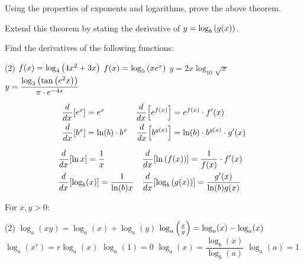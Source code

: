 \documentclass[mathNotesPreamble]{subfiles}
\begin{document}
  \begin{ex*}
    Using the properties of exponents and logarithms, prove the above theorem. 
    
    \noindent
    Extend this theorem by stating the derivative of $y=\log_b\parens{g(x)}$.
  \end{ex*}
  \vfill
  \begin{ex*}
    Find the derivatives of the following functions:
  \end{ex*}
  \begin{tasks}[after-item-skip=\stretch{1}, label=~](2)
    \task $f(x)=\log_4\parens{4x^2+3x}$
    \task $f(x)=\log_5\parens{x e^x}$
    \task $y=2x\log_{10}\sqrt x$
    \task $y=\dfrac{\log_3\parens{\tan\parens{e^2x}}}{\pi\cdot e\inv[4x]}$
  \end{tasks}
  \vfill
  \pagebreak
  
  \setlength{\jot}{10pt}
  \begin{thmBox*}
    \begin{align*}
      \hspace*{-10pt}
      \ddx \sbrkt{e^x}&=e^x&  \ddx \sbrkt{e^{f(x)}}&=e^{f(x)}\cdot f'(x)\\
      \hspace*{-10pt}
      \ddx \sbrkt{b^x}&=\ln(b)\cdot b^x&  \ddx \sbrkt{b^{g(x)}}&=\ln(b)\cdot b^{g(x)}\cdot g'(x)\hspace*{-10pt}
    \end{align*}
  \end{thmBox*}

  \begin{thmBox*}
    \begin{align*}
      \hspace*{-10pt}
      &\ddx\sbrkt{\ln x}=\frac{1}{x}& &\ddx\sbrkt{\ln\parens{f(x)}}=\frac{1}{f(x)}\cdot f'(x)\hspace*{-10pt}\\
      \hspace*{-10pt}
      &\ddx\sbrkt{\log_b(x)}=\frac{1}{\ln(b) x}& &\ddx\sbrkt{\log_b\parens{g(x)}}=\frac{g'(x)}{\ln(b) g(x)}
    \end{align*} 
  \end{thmBox*}

   \begin{thmBox*}
    For $x,y>0$:
      \begin{tasks}[after-item-skip=10pt, label=~](2)
        \task $\log_a(xy)=\log_a(x)+\log_a(y)$
        \task $\log_a\parens{\frac{x}{y}}=\log_a(x)-\log_a(x)$
        \task $\log_a(x^r)=r\log_a(x)$
        \task $\log_a(1)=0$
        \task $\log_a(x)=\dfrac{\log_b(x)}{\log_b(a)}$
        \task $\log_a(a)=1$
      \end{tasks}
   \end{thmBox*}
    \pagebreak
  
\end{document}
